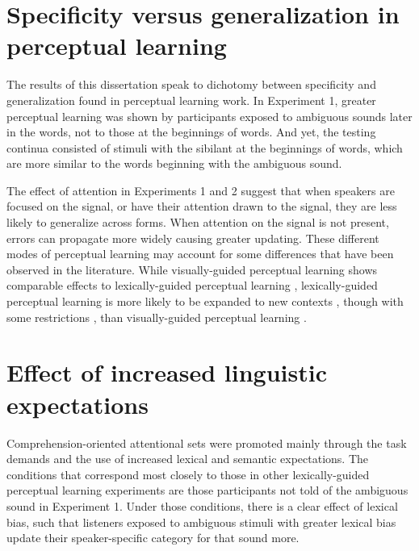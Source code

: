 \section{Specificity versus generalization in perceptual learning}

The results of this dissertation speak to dichotomy between specificity and generalization found in perceptual learning work. 
In Experiment 1, greater perceptual learning was shown by participants exposed to ambiguous sounds later in the words, not to those at the beginnings of words. 
And yet, the testing continua consisted of stimuli with the sibilant at the beginnings of words, which are more similar to the words beginning with the ambiguous sound.

The effect of attention in Experiments 1 and 2 suggest that when speakers are focused on the signal, or have their attention drawn to the signal, they are less likely to generalize across forms.
When attention on the signal is not present, errors can propagate more widely causing greater updating.
These different modes of perceptual learning may account for some differences that have been observed in the literature.
While visually-guided perceptual learning shows comparable effects to lexically-guided perceptual learning \citep{vanLinden2007}, lexically-guided perceptual learning is more likely to be expanded to new contexts \citep{Norris2003, Kraljic2008a}, though with some restrictions \citep{Mitterer2013}, than visually-guided perceptual learning \citep{Reinisch2014}.

\section{Effect of increased linguistic expectations}

Comprehension-oriented attentional sets were promoted mainly through the task demands and the use of increased lexical and semantic expectations.
The conditions that correspond most closely to those in other lexically-guided perceptual learning experiments \citep{Norris2003, Kraljic2005} are those participants not told of the ambiguous sound in Experiment 1.
Under those conditions, there is a clear effect of lexical bias, such that listeners exposed to ambiguous stimuli with greater lexical bias update their speaker-specific category for that sound more.


